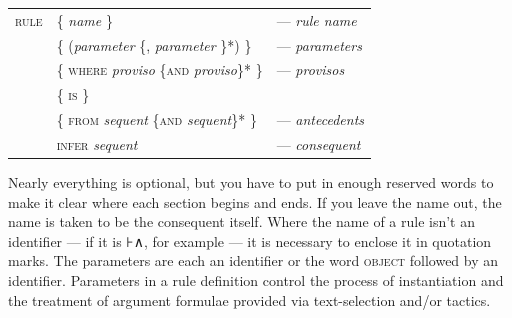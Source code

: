 \begin{tabular}{lll}
\textsc{rule} & \{ \textit{name} \} & --- \textit{rule name}\\
 & \{ (\textit{parameter} \{, \textit{parameter} \}*) \} & --- \textit{parameters}\\
 & \{ \textsc{where} \textit{proviso} \{\textsc{and} \textit{proviso}\}* \} & --- \textit{provisos}\\
 & \{ \textsc{is} \}\\
 & \{ \textsc{from} \textit{sequent} \{\textsc{and} \textit{sequent}\}* \} & --- \textit{antecedents}\\
 & \textsc{infer} \textit{sequent} & --- \textit{consequent}
\end{tabular}

Nearly everything is optional, but you have to put in enough reserved words to make it clear where each section begins and ends. If you leave the name out, the name is taken to be the consequent itself. Where the name of a rule isn't an identifier --- if it is ⊦∧, for example --- it is necessary to enclose it in quotation marks. The parameters are each an identifier or the word \textsc{object} followed by an identifier. Parameters in a rule definition control the process of instantiation and the treatment of argument formulae provided via text-selection and/or tactics.

